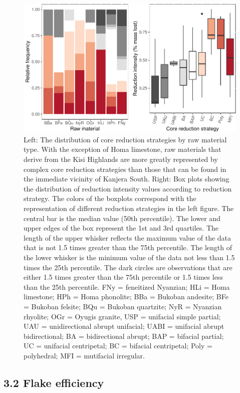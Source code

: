 \documentclass[]{elsarticle} %
\begin{document}
\begin{figure}
\centering
\includegraphics{Kanjera_South_Manuscript_files/figure-latex/fig-5-1.pdf}
\caption{Left: The distribution of core reduction strategies by raw
material type. With the exception of Homa limestone, raw materials that
derive from the Kisi Highlands are more greatly represented by complex
core reduction strategies than those that can be found in the immediate
vicinity of Kanjera South. Right: Box plots showing the distribution of
reduction intensity values according to reduction strategy. The colors
of the boxplots correspond with the representation of different
reduction strategies in the left figure. The central bar is the median
value (50th percentile). The lower and upper edges of the box represent
the 1st and 3rd quartiles. The length of the upper whisker reflects the
maximum value of the data that is not 1.5 times greater than the 75th
percentile. The length of the lower whisker is the minimum value of the
data not less than 1.5 times the 25th percentile. The dark circles are
observations that are either 1.5 times greater than the 75th percentile
or 1.5 times less than the 25th percentile. FNy = feneitized Nyanzian;
HLi = Homa limestone; HPh = Homa phonolite; BBa = Bukoban andesite; BFe
= Bukoban felsite; BQu = Bukoban quartzite; NyR = Nyanzian rhyolite; OGr
= Oyugis granite, USP = unifacial simple partial; UAU = unidirectional
abrupt unifacial; UABI = unifacial abrupt bidirectional; BA =
bidirectional abrupt; BAP = bifacial partial; UC = unifacial
centripetal; BC = bifacial centripetal; Poly = polyhedral; MFI =
mutifacial irregular. \label{core.tech}}
\end{figure}

\hypertarget{flake-efficiency-1}{%
\subsection{3.2 Flake efficiency}\label{flake-efficiency-1}}
\end{document}
